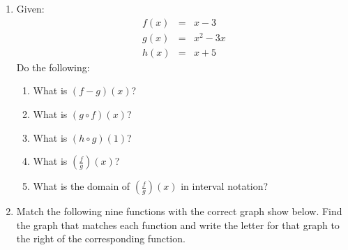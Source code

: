 \documentclass[letterpaper,12pt,fleqn]{article}
\begin{document}
\begin{enumerate}
\newpage

\item Given:
  \begin{eqnarray*}
    f(x) &=& x-3 \\
    g(x) &=& x^2-3x \\
    h(x) &=& x+5
  \end{eqnarray*}
  Do the following:
  \begin{enumerate}
  \item What is $(f-g)(x)$?

    \vspace{1.25in}
    
  \item What is $(g\circ f)(x)$?

    \vspace{1.25in}
    
  \item What is $(h\circ g)(1)$?

    \vspace{1.25in}
    
  \item What is $\left(\frac{f}{g}\right)(x)$?

    \vspace{1.25in}
    
  \item What is the domain of $\left(\frac{f}{g}\right)(x)$ in interval
    notation?
  \end{enumerate}

  \newpage

  \newcommand{\ans}{\rule{0.5in}{1pt}}

\item Match the following nine functions with the correct graph show below. Find
  the graph that matches each function and write the letter for that graph
  to the right of the corresponding function.

  \vspace{0.25in}


\end{enumerate}
\end{document}
